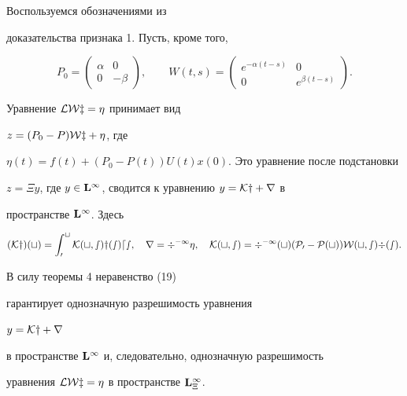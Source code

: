 \begin{pf} Воспользуемся обозначениями из


доказательства признака 1. Пусть, кроме того,


$$


P_0=


\begin{pmatrix}


\alpha & 0\\


0 & -\beta


\end{pmatrix},


\qquad


W(t,s)=


\begin{pmatrix}


e^{-\alpha(t-s)} & 0\\


0 & e^{\beta(t-s)}


\end{pmatrix}.


$$


Уравнение $\cal L\cal W z=\eta$ принимает вид


$z=(P_0-P)\cal W z+\eta$, где


$\eta(t)=f(t)+(P_0-P(t))U(t)x(0)$. Это уравнение после подстановки


$z=\Xi y$, где $y\in\bold L^\infty$, сводится к уравнению $y=\cal K y+r$ в


пространстве $\bold L^\infty$. Здесь


$$


(\cal K y)(t)=\int_0^tK(t,s)y(s)ds,\quad


r=\Xi^{-1}\eta,\quad


K(t,s)=\Xi^{-1}(t)(P_0-P(t))W(t,s)\Xi(s).


$$





В силу теоремы 4 неравенство (19)


гарантирует однозначную разрешимость уравнения\linebreak




$y=\cal K y+r$


в пространстве $\bold L^\infty$ и, следовательно, однозначную разрешимость


уравнения $\cal L\cal W z=\eta$ в пространстве $\bold L^\infty_\Xi$.






\end{pf}
